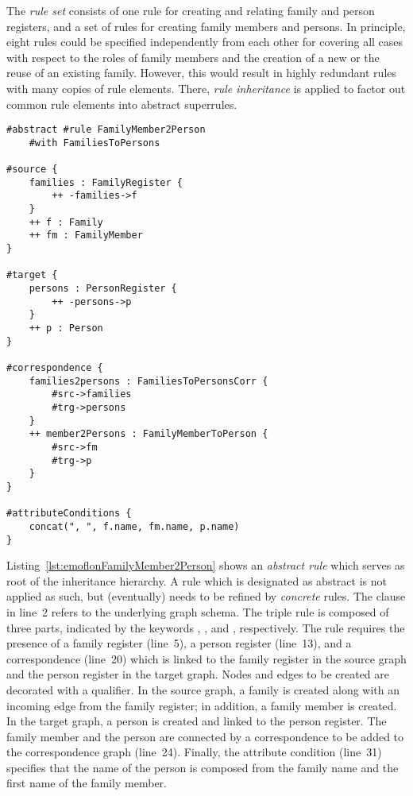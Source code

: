 The \emph{rule set} consists of one rule for creating and relating family and person registers, and a set of rules for creating family members and persons. In principle, eight rules could be specified independently from each other for covering all cases with respect to the roles of family members and the creation of a new or the reuse of an existing family. However, this would result in highly redundant rules with many copies of rule elements. There, \emph{rule inheritance} is applied to factor out common rule elements into abstract superrules.  

\begin{lstlisting}[label={lst:emoflonFamilyMember2Person}, float=htb!, language=emoflon, caption={Mapping family members to persons}]
#abstract #rule FamilyMember2Person 
    #with FamiliesToPersons

#source { 
    families : FamilyRegister {
        ++ -families->f
    }
    ++ f : Family
    ++ fm : FamilyMember
}

#target {
    persons : PersonRegister {
        ++ -persons->p
    }
    ++ p : Person
}

#correspondence {
    families2persons : FamiliesToPersonsCorr {
        #src->families
        #trg->persons
    }
    ++ member2Persons : FamilyMemberToPerson {
        #src->fm
        #trg->p
    }
}

#attributeConditions {
    concat(", ", f.name, fm.name, p.name)
}
\end{lstlisting}


Listing~\ref{lst:emoflonFamilyMember2Person} shows an \emph{abstract rule} which serves as root of the inheritance hierarchy. A rule which is designated as abstract is not applied as such, but (eventually) needs to be refined by \emph{concrete} rules. The  clause in line~2 refers to the underlying graph schema. The triple rule is composed of three parts, indicated by the keywords , , and , respectively. The rule requires the presence of a family register (line~5), a person register (line~13), and a correspondence (line~20) which is linked to the family register in the source graph and the person register in the target graph. Nodes and edges to be created are decorated with a \code{++} qualifier. In the source graph, a family is created along with an incoming edge from the family register; in addition, a family member is created. In the target graph, a person is created and linked to the person register. The family member and the person are connected by a correspondence to be added to the correspondence graph (line~24). Finally, the attribute condition (line~31) specifies that the name of the person is composed from the family name and the first name of the family member.

